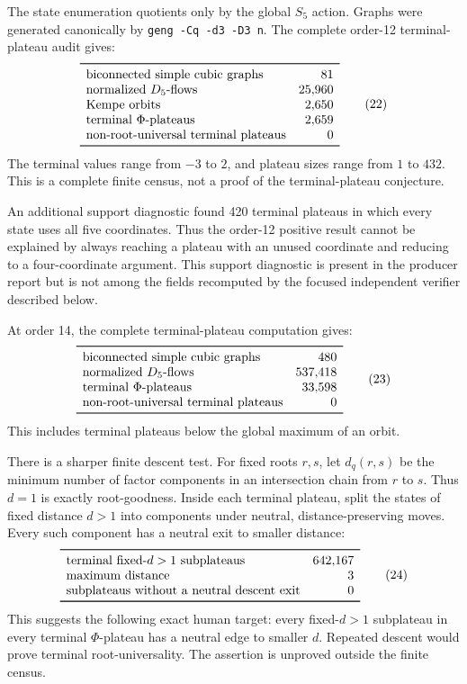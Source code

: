 \documentclass[11pt]{article}
\theoremstyle{definition}
\theoremstyle{remark}
\begin{document}
The state enumeration quotients only by the global \(S_5\) action.  Graphs
were generated canonically by \texttt{geng -Cq -d3 -D3 n}.  The complete
order-12 terminal-plateau audit gives:
\[
\begin{array}{lr}
\toprule
\text{biconnected simple cubic graphs} &81\\
\text{normalized \(D_5\)-flows} &25{,}960\\
\text{Kempe orbits} &2{,}650\\
\text{terminal \(\Phi\)-plateaus} &2{,}659\\
\text{non-root-universal terminal plateaus} &0\\
\bottomrule
\end{array}                                                  \tag{22}
\]
The terminal values range from \(-3\) to \(2\), and plateau sizes range
from \(1\) to \(432\).  This is a complete finite census, not a proof of
the terminal-plateau conjecture.

An additional support diagnostic found 420 terminal plateaus in which
every state uses all five coordinates.  Thus the order-12 positive result
cannot be explained by always reaching a plateau with an unused
coordinate and reducing to a four-coordinate argument.  This support
diagnostic is present in the producer report but is not among the fields
recomputed by the focused independent verifier described below.

At order 14, the complete terminal-plateau computation gives:
\[
\begin{array}{lr}
\toprule
\text{biconnected simple cubic graphs} &480\\
\text{normalized \(D_5\)-flows} &537{,}418\\
\text{terminal \(\Phi\)-plateaus} &33{,}598\\
\text{non-root-universal terminal plateaus} &0\\
\bottomrule
\end{array}                                                  \tag{23}
\]
This includes terminal plateaus below the global maximum of an orbit.

There is a sharper finite descent test.  For fixed roots \(r,s\), let
\(d_q(r,s)\) be the minimum number of factor components in an
intersection chain from \(r\) to \(s\).  Thus \(d=1\) is exactly
root-goodness.  Inside each terminal plateau, split the states of fixed
distance \(d>1\) into components under neutral, distance-preserving
moves.  Every such component has a neutral exit to smaller distance:
\[
\begin{array}{lr}
\toprule
\text{terminal fixed-\(d>1\) subplateaus} &642{,}167\\
\text{maximum distance} &3\\
\text{subplateaus without a neutral descent exit} &0\\
\bottomrule
\end{array}                                                  \tag{24}
\]
This suggests the following exact human target: every fixed-\(d>1\)
subplateau in every terminal \(\Phi\)-plateau has a neutral edge to
smaller \(d\).  Repeated descent would prove terminal
root-universality.  The assertion is unproved outside the finite census.
\end{document}

